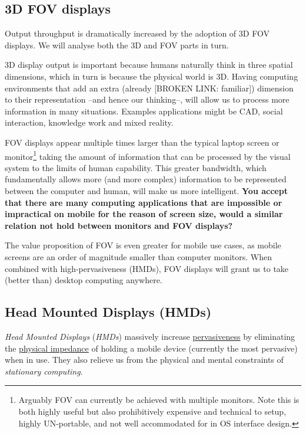 \documentclass[logo,bsc,singlespacing,parskip]{infthesis}
\begin{document}
\subsection{3D FOV displays}
\label{sec:org70f7197}
Output throughput is dramatically increased by the adoption of 3D FOV displays.
We will analyse both the  3D and FOV parts in turn.

3D display output is important because humans naturally think in three spatial dimensions, which in  turn is because the physical world is 3D.
Having computing environments that add an extra (already [BROKEN LINK: familiar]) dimension to their representation --and hence our thinking--, will allow us to process more information in many situations.
Examples applications might be CAD, social interaction, knowledge work and mixed reality.

FOV displays appear multiple times larger than the typical laptop screen or monitor\footnote{Arguably FOV can currently be achieved with multiple monitors. Note this is both highly useful but also prohibitively expensive and technical to setup, highly UN-portable, and not well accommodated for in OS interface design.} taking the amount of information that can be processed by the visual system to the limits of human capability.
This greater bandwidth, which fundamentally allows more (and more complex) information to be represented between the computer and human, will make us more intelligent.
\textbf{You accept that there are many computing applications that are impossible or impractical on mobile for the reason of screen size, would a similar relation not hold between monitors and FOV displays?}

The value proposition of FOV is even greater for mobile use cases, as mobile screens are an order of magnitude smaller than computer monitors.
When combined with high-pervasiveness (HMDs), FOV displays will grant us to take (better than) desktop computing anywhere.

\subsection{Head Mounted Displays (HMDs)}
\label{sec:org84f408a}
\emph{Head Mounted Displays} (\emph{HMDs}) massively increase \hyperref[pervasiveness]{pervasiveness} by eliminating the \hyperref[physical impedance]{physical impedance} of holding a mobile device (currently the most pervasive) when in use.
They also relieve us from the physical and mental constraints of \emph{stationary computing}.
\end{document}
